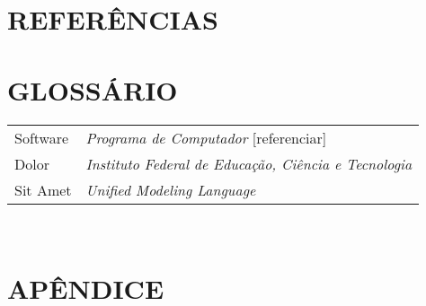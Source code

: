 \documentclass[12pt,a4paper]{article}
\begin{document}
			\lipsum[1]

	\newpage


	\section*{REFERÊNCIAS}

	\printbibliography[heading=none]

	\newpage

	\section*{GLOSSÁRIO}

	\begin{tabular}{p{3cm} p{}}
	  Software & \textit{Programa de Computador} [referenciar] \\
	  Dolor & \textit{Instituto Federal de Educação, Ciência e Tecnologia} \\
	  Sit Amet & \textit{Unified Modeling Language} \\
	\end{tabular}\\


	\newpage

	\section*{APÊNDICE}

	\lipsum[1]

	\newpage
\end{document}
